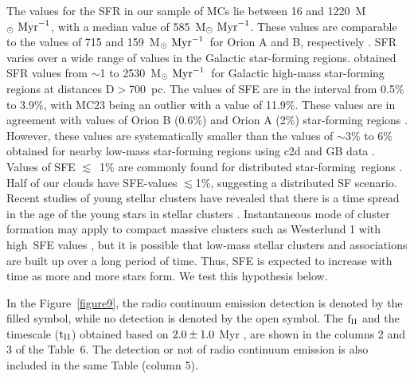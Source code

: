 \documentclass[iop]{emulateapj}
\newcommand{\starf}{star-forming}
\newcommand{\msunmyr}{M$_{\odot}~{\rm Myr}^{-1}$}
\begin{document}
The values for the SFR in our sample of MCs lie between 16 and
1220~\msunmyr, with a median value of 585~\msunmyr. These values are 
comparable to the values of 715 and 159~\msunmyr\ for 
Orion A and B, respectively \citep{lada+10}. 
SFR varies over a wide range of values in the Galactic star-forming regions.
\citet{vuti+evans13} obtained SFR values from $\sim$1 to 2530~\msunmyr\ 
for Galactic high-mass star-forming regions at distances D$>$700~pc. 
The values of SFE are in the interval from 0.5\% to 
3.9\%, with MC23 being an outlier with a value of 11.9\%. These values are in 
agreement with values of Orion B (0.6\%) and Orion A (2\%)  
star-forming regions \citep{megeath+12}. However, these values
are systematically smaller than the values of $\sim$3\% to 6\% 
obtained for nearby low-mass star-forming regions using c2d and GB data 
\citep{evans+09}. 
Values of SFE $\lesssim$~1\% are commonly found 
for distributed \starf\ regions \citep{bonell+11}. Half of our 
clouds have SFE-values $\lesssim$1\%, suggesting a distributed 
SF scenario. Recent studies of young stellar clusters have revealed 
that there is a time spread in the age of the young stars in 
stellar clusters \citep{myers12,foster+14}. 
Instantaneous mode of cluster formation may apply to compact massive 
clusters such as 
Westerlund 1 with high~SFE values \citep{kudryavtseva+12}, but it 
is possible that low-mass stellar clusters and associations are built up 
over a long period of time. Thus, SFE is expected to increase with time 
as more and more stars form. We test this hypothesis below.


In the Figure~\ref{figure9}, the radio continuum emission detection  
is denoted by the filled symbol, while no detection is denoted by 
the open symbol. 
The $\rm f_{II}$ and the timescale ($\rm t_{II}$) obtained based on 
$\rm 2.0\pm1.0$ Myr \citep{evans+09}, are shown in the columns 2 and 3 of the 
Table~6. The detection or not of radio continuum emission is also included 
in the same Table (column 5).
\end{document}
